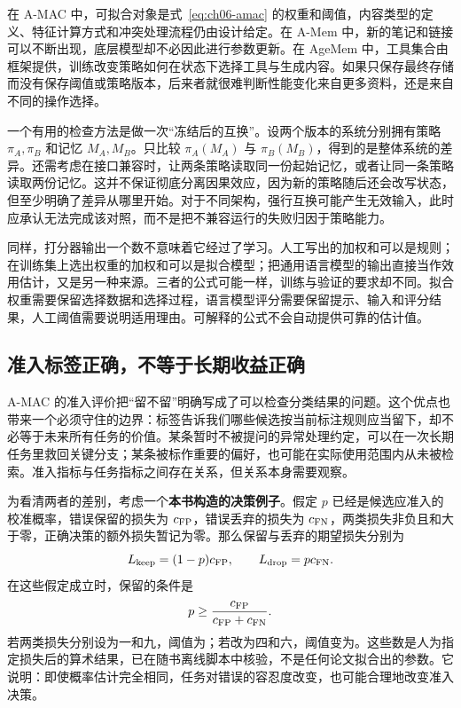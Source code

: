 在 A-MAC 中，可拟合对象是式~\eqref{eq:ch06-amac} 的权重和阈值，内容类型的定义、特征计算方式和冲突处理流程仍由设计给定\cite{amac-2603}。在 A-Mem 中，新的笔记和链接可以不断出现，底层模型却不必因此进行参数更新\cite{amem-2502}。在 AgeMem 中，工具集合由框架提供，训练改变策略如何在状态下选择工具与生成内容\cite{agemem-2601}。如果只保存最终存储而没有保存阈值或策略版本，后来者就很难判断性能变化来自更多资料，还是来自不同的操作选择。

一个有用的检查方法是做一次“冻结后的互换”。设两个版本的系统分别拥有策略 $\pi_A,\pi_B$ 和记忆 $M_A,M_B$。只比较 $\pi_A(M_A)$ 与 $\pi_B(M_B)$，得到的是整体系统的差异。还需考虑在接口兼容时，让两条策略读取同一份起始记忆，或者让同一条策略读取两份记忆。这并不保证彻底分离因果效应，因为新的策略随后还会改写状态，但至少明确了差异从哪里开始。对于不同架构，强行互换可能产生无效输入，此时应承认无法完成该对照，而不是把不兼容运行的失败归因于策略能力。

同样，打分器输出一个数不意味着它经过了学习。人工写出的加权和可以是规则；在训练集上选出权重的加权和可以是拟合模型；把通用语言模型的输出直接当作效用估计，又是另一种来源。三者的公式可能一样，训练与验证的要求却不同。拟合权重需要保留选择数据和选择过程，语言模型评分需要保留提示、输入和评分结果，人工阈值需要说明适用理由。可解释的公式不会自动提供可靠的估计值。

\subsection{准入标签正确，不等于长期收益正确}

A-MAC 的准入评价把“留不留”明确写成了可以检查分类结果的问题。这个优点也带来一个必须守住的边界：标签告诉我们哪些候选按当前标注规则应当留下，却不必等于未来所有任务的价值。某条暂时不被提问的异常处理约定，可以在一次长期任务里救回关键分支；某条被标作重要的偏好，也可能在实际使用范围内从未被检索。准入指标与任务指标之间存在关系，但关系本身需要观察。

为看清两者的差别，考虑一个\textbf{本书构造的决策例子}。假定 $p$ 已经是候选应准入的校准概率，错误保留的损失为 $c_{\rm FP}$，错误丢弃的损失为 $c_{\rm FN}$，两类损失非负且和大于零，正确决策的额外损失暂记为零。那么保留与丢弃的期望损失分别为
\begin{equation}
L_{\rm keep}=(1-p)c_{\rm FP},\qquad
L_{\rm drop}=p c_{\rm FN}.
\end{equation}
在这些假定成立时，保留的条件是
\begin{equation}
p\geq \frac{c_{\rm FP}}{c_{\rm FP}+c_{\rm FN}}.
\label{eq:ch06-loss-threshold}
\end{equation}
若两类损失分别设为一和九，阈值为；若改为四和六，阈值变为。这些数是人为指定损失后的算术结果，已在随书离线脚本中核验，不是任何论文拟合出的参数。它说明：即使概率估计完全相同，任务对错误的容忍度改变，也可能合理地改变准入决策。

